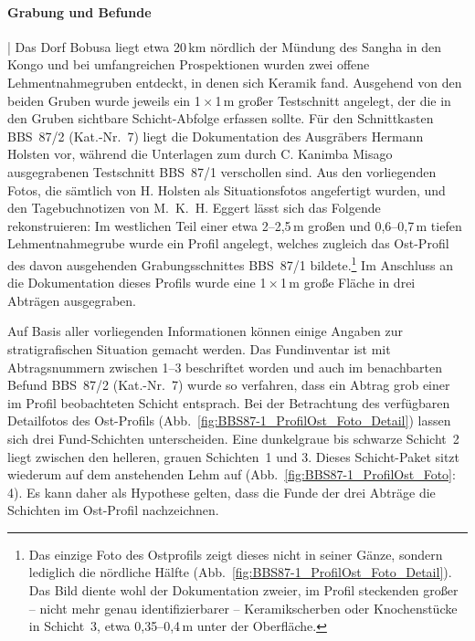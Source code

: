 \paragraph{Grabung und Befunde}\hspace{-.5em}|\hspace{.5em}%
Das Dorf Bobusa liegt etwa 20\,km nördlich der Mündung des \mbox{Sangha} in den Kongo und bei umfangreichen Prospektionen wurden zwei offene Lehmentnahmegruben entdeckt, in denen sich Keramik fand. Ausgehend von den beiden Gruben wurde jeweils ein 1\,$\times$\,1\,m großer Testschnitt angelegt, der die in den Gruben sichtbare Schicht-Abfolge erfassen sollte. Für den Schnittkasten BBS~87/2 (Kat.-Nr.~7) liegt die Dokumentation des Ausgräbers Hermann Holsten vor, während die Unterlagen zum durch C. Kanimba Misago ausgegrabenen Testschnitt BBS~87/1 verschollen sind. Aus den vorliegenden Fotos, die sämtlich von H. Holsten als Situationsfotos angefertigt wurden, und den Tagebuchnotizen von M.~K.~H. Eggert lässt sich das Folgende rekonstruieren: Im westlichen Teil einer etwa 2--2,5\,m großen und 0,6--0,7\,m tiefen Lehmentnahmegrube wurde ein Profil angelegt, welches zugleich das Ost-Profil des davon ausgehenden Grabungsschnittes BBS~87/1 bildete.\footnote{Das einzige Foto des Ostprofils zeigt dieses nicht in seiner Gänze, sondern lediglich die nördliche Hälfte (Abb.~\ref{fig:BBS87-1_ProfilOst_Foto_Detail}). Das Bild diente wohl der Dokumentation zweier, im Profil steckenden großer -- nicht mehr genau identifizierbarer -- Keramikscherben oder Knochenstücke in Schicht~3, etwa 0,35--0,4\,m unter der Oberfläche.} Im Anschluss an die Dokumentation dieses Profils wurde eine 1\,$\times$\,1\,m große Fläche in drei Abträgen ausgegraben.

Auf Basis aller vorliegenden Informationen können einige Angaben zur stratigrafischen Situation gemacht werden. Das Fundinventar ist mit Abtragsnummern zwischen 1--3 beschriftet worden und auch im benachbarten Befund BBS~87/2 (Kat.-Nr.~7) wurde so verfahren, dass ein Abtrag grob einer im Profil beobachteten Schicht entsprach. Bei der Betrachtung des verfügbaren Detailfotos des Ost-Profils (Abb.~\ref{fig:BBS87-1_ProfilOst_Foto_Detail}) lassen sich drei Fund-Schichten unterscheiden. Eine dunkelgraue bis schwarze Schicht~2 liegt zwischen den helleren, grauen Schichten~1 und 3. Dieses Schicht-Paket sitzt wiederum auf dem anstehenden Lehm auf (Abb.~\ref{fig:BBS87-1_ProfilOst_Foto}: 4). Es kann daher als Hypothese gelten, dass die Funde der drei Abträge die Schichten im Ost-Profil nachzeichnen.


